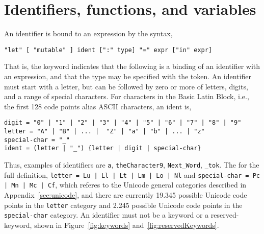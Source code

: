 \chapter{Identifiers, functions, and variables}
\label{chap:let}
An identifier is bound to an expression by the syntax,
%
\begin{lstlisting}[language=EBNF]
"let" [ "mutable" ] ident [":" type] "=" expr ["in" expr]
\end{lstlisting}
\begin{comment}
or alternatively
%
\begin{lstlisting}[language=EBNF]
"let" ["mutable"] ident [":" type] "=" expr ["in" newline indent exp]
\end{lstlisting}
\end{comment}
That is, the  keyword indicates that the following is a binding of an identifier with an expression, and that the type may be specified with the \idx{\token{:}} token. An identifier must start with a letter, but can be followed by zero or more of letters, digits, and a range of special characters. For characters in the Basic Latin Block, i.e., the first 128 code points alias ASCII characters, an ident is,
%
\begin{lstlisting}[language=EBNF]
digit = "0" | "1" | "2" | "3" | "4" | "5" | "6" | "7" | "8" | "9"
letter = "A" | "B" | ... |  "Z" | "a" | "b" | ... | "z"
special-char = "_"
ident = (letter | "_") {letter | digit | special-char}
\end{lstlisting}
%
Thus, examples of identifiers are \lstinline{a}, \lstinline{theCharacter9}, \lstinline{Next_Word}, \lstinline{_tok}. The for the full definition, \lstinline[language=EBNF]{letter = Lu | Ll | Lt | Lm | Lo | Nl} and \lstinline[language=EBNF]{special-char = Pc | Mn | Mc | Cf}, which referes to the Unicode general categories described in Appendix~\ref{sec:unicode}, and there are currently 19.345 possible Unicode code points in the \lstinline[language=EBNF]{letter} category and 2.245 possible Unicode code points in the \lstinline[language=EBNF]{special-char} category. An identifier must not be a keyword or a reserved-keyword, shown in Figure~\ref{fig:keywords} and~\ref{fig:reservedKeywords}.
